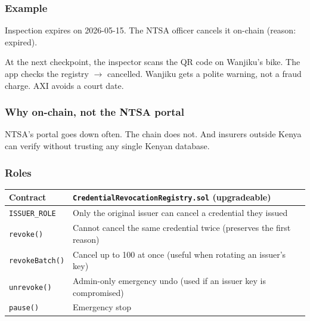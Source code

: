 \documentclass[11pt,a4paper]{article}
\begin{document}
\subsubsection{Example}

\begin{scenariobox}[title=ROAM rider Wanjiku's NTSA inspection]
Inspection expires on 2026-05-15. The NTSA officer cancels it on-chain (reason: expired).

\vspace{2pt}
At the next checkpoint, the inspector scans the QR code on Wanjiku's bike. The app checks the registry $\rightarrow$ cancelled. Wanjiku gets a polite warning, not a fraud charge. AXI avoids a court date.
\end{scenariobox}

\subsubsection{Why on-chain, not the NTSA portal}
NTSA's portal goes down often. The chain does not. And insurers outside Kenya can verify without trusting any single Kenyan database.

\subsubsection{Roles}

\begin{center}
\begin{tabular}{p{3.8cm} p{11.5cm}}
\toprule
{\bfseries\color{axiprimary}Contract} & \texttt{CredentialRevocationRegistry.sol} (upgradeable) \\
\midrule
\texttt{ISSUER\_ROLE} & Only the original issuer can cancel a credential they issued \\
\texttt{revoke()} & Cannot cancel the same credential twice (preserves the first reason) \\
\texttt{revokeBatch()} & Cancel up to 100 at once (useful when rotating an issuer's key) \\
\texttt{unrevoke()} & Admin-only emergency undo (used if an issuer key is compromised) \\
\texttt{pause()} & Emergency stop \\
\bottomrule
\end{tabular}
\end{center}

\newpage
\end{document}
